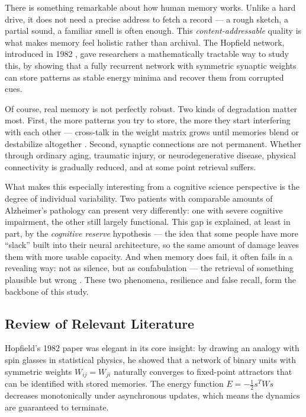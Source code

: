 \documentclass[11pt,a4paper]{article}
\begin{document}
There is something remarkable about how human memory works. Unlike a hard drive, it does not need a precise address to fetch a record --- a rough sketch, a partial sound, a familiar smell is often enough. This \textit{content-addressable} quality is what makes memory feel holistic rather than archival. The Hopfield network, introduced in 1982 \cite{hopfield1982}, gave researchers a mathematically tractable way to study this, by showing that a fully recurrent network with symmetric synaptic weights can store patterns as stable energy minima and recover them from corrupted cues.

Of course, real memory is not perfectly robust. Two kinds of degradation matter most. First, the more patterns you try to store, the more they start interfering with each other --- cross-talk in the weight matrix grows until memories blend or destabilize altogether \cite{amit1985,mceliece1987}. Second, synaptic connections are not permanent. Whether through ordinary aging, traumatic injury, or neurodegenerative disease, physical connectivity is gradually reduced, and at some point retrieval suffers.

What makes this especially interesting from a cognitive science perspective is the degree of individual variability. Two patients with comparable amounts of Alzheimer's pathology can present very differently: one with severe cognitive impairment, the other still largely functional. This gap is explained, at least in part, by the \textit{cognitive reserve} hypothesis \cite{stern2002,stern2012} --- the idea that some people have more ``slack'' built into their neural architecture, so the same amount of damage leaves them with more usable capacity. And when memory does fail, it often fails in a revealing way: not as silence, but as confabulation --- the retrieval of something plausible but wrong \cite{roediger1995,bartlett1932}. These two phenomena, resilience and false recall, form the backbone of this study.

\subsection{Review of Relevant Literature}

Hopfield's 1982 paper \cite{hopfield1982} was elegant in its core insight: by drawing an analogy with spin glasses in statistical physics, he showed that a network of binary units with symmetric weights $W_{ij} = W_{ji}$ naturally converges to fixed-point attractors that can be identified with stored memories. The energy function $E = -\frac{1}{2} s^T W s$ decreases monotonically under asynchronous updates, which means the dynamics are guaranteed to terminate.
\end{document}
